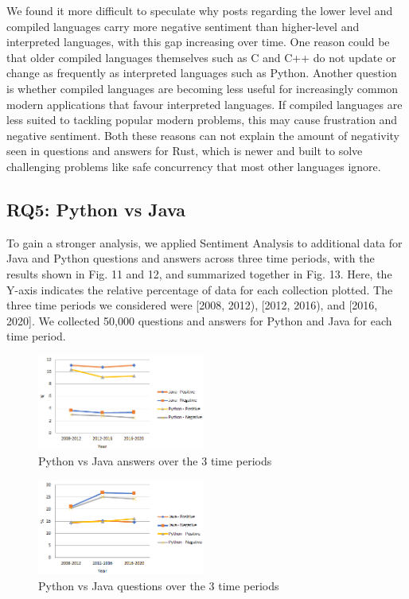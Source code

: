 \documentclass[conference]{IEEEtran}
\begin{document}
We found it more difficult to speculate why posts regarding the lower level and compiled languages carry more negative sentiment than higher-level and interpreted languages, with this gap increasing over time. One reason could be that older compiled languages themselves such as C and C++ do not update or change as frequently as interpreted languages such as Python. Another question is whether compiled languages are becoming less useful for increasingly common modern applications that favour interpreted languages. If compiled languages are less suited to tackling popular modern problems, this may cause frustration and negative sentiment. Both these reasons can not explain the amount of negativity seen in questions and answers for Rust, which is newer and built to solve challenging problems like safe concurrency that most other languages ignore\cite{b40}.


\subsection{RQ5: Python vs Java}
To gain a stronger analysis, we applied Sentiment Analysis to additional data for Java and Python questions and answers across three time periods, with the results shown in Fig. 11 and 12, and summarized together in Fig. 13. Here, the Y-axis indicates the relative percentage of data for each collection plotted. The three time periods we considered were [2008, 2012), [2012, 2016), and [2016, 2020]. We collected 50,000 questions and answers for Python and Java for each time period. \\

\begin{figure}[htbp]
\centerline{\includegraphics[width=0.49\textwidth]{figures/Java-python-answers.png}}
\caption{Python vs Java answers over the 3 time periods}
\label{fig}
\end{figure}

\begin{figure}[htbp]
\centerline{\includegraphics[width=0.49\textwidth]{figures/Java-python-questions.png}}
\caption{Python vs Java questions over the 3 time periods}
\label{fig}
\end{figure}
\end{document}
